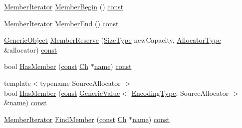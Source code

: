 \begin{DoxyCompactItemize}
\item 
\hyperlink{classGenericObject_a1f531d70f8d57ed30199ac445b5935e6}{Member\+Iterator} \hyperlink{classGenericObject_af1e80a8a521f05530f9b6a448242ff2d}{Member\+Begin} () \hyperlink{classGenericObject_af70c9646b5e422306c33e98b3d8783a7}{const}
\item 
\hyperlink{classGenericObject_a1f531d70f8d57ed30199ac445b5935e6}{Member\+Iterator} \hyperlink{classGenericObject_a75873786614f67796bfb190008e004dc}{Member\+End} () \hyperlink{classGenericObject_af70c9646b5e422306c33e98b3d8783a7}{const}
\item 
\hyperlink{classGenericObject}{Generic\+Object} \hyperlink{classGenericObject_af750abd40d05136da98705899b4575c2}{Member\+Reserve} (\hyperlink{rapidjson_8h_a5ed6e6e67250fadbd041127e6386dcb5}{Size\+Type} new\+Capacity, \hyperlink{classGenericObject_a00c8cee952d5ebadc5e1c309aa489ad9}{Allocator\+Type} \&allocator) \hyperlink{classGenericObject_af70c9646b5e422306c33e98b3d8783a7}{const}
\item 
bool \hyperlink{classGenericObject_a996d775e52cc7c5cf2aa308cf5a2b2cf}{Has\+Member} (\hyperlink{classGenericObject_af70c9646b5e422306c33e98b3d8783a7}{const} \hyperlink{classGenericObject_ac6747e5baa13e15bcea1658b5624647a}{Ch} $\ast$\hyperlink{imgui__impl__opengl3__loader_8h_a5c4947d4516dd7cfa3505ce3a648a4ef}{name}) \hyperlink{classGenericObject_af70c9646b5e422306c33e98b3d8783a7}{const}
\item 
{\footnotesize template$<$typename Source\+Allocator $>$ }\\bool \hyperlink{classGenericObject_a0b63666ca05c86f9d719350f2302a3f7}{Has\+Member} (\hyperlink{classGenericObject_af70c9646b5e422306c33e98b3d8783a7}{const} \hyperlink{classGenericValue}{Generic\+Value}$<$ \hyperlink{classGenericObject_a96ebfdde095e2ce42535d15ae5dc58ef}{Encoding\+Type}, Source\+Allocator $>$ \&\hyperlink{imgui__impl__opengl3__loader_8h_a5c4947d4516dd7cfa3505ce3a648a4ef}{name}) \hyperlink{classGenericObject_af70c9646b5e422306c33e98b3d8783a7}{const}
\item 
\hyperlink{classGenericObject_a1f531d70f8d57ed30199ac445b5935e6}{Member\+Iterator} \hyperlink{classGenericObject_a979890ccb3b116af19f9e3e77d3d286f}{Find\+Member} (\hyperlink{classGenericObject_af70c9646b5e422306c33e98b3d8783a7}{const} \hyperlink{classGenericObject_ac6747e5baa13e15bcea1658b5624647a}{Ch} $\ast$\hyperlink{imgui__impl__opengl3__loader_8h_a5c4947d4516dd7cfa3505ce3a648a4ef}{name}) \hyperlink{classGenericObject_af70c9646b5e422306c33e98b3d8783a7}{const}
\item 

\end{DoxyCompactItemize}
